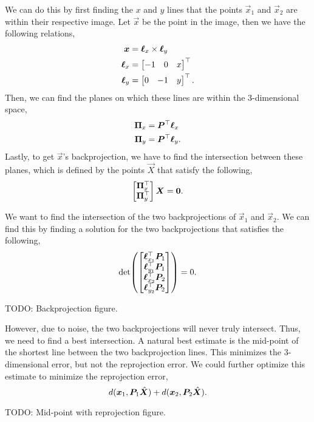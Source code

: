 We can do this by first finding the $x$ and $y$ lines that the points
$\vec{x}_1$ and $\vec{x}_2$ are within their respective image. Let $\vec{x}$ be
the point in the image, then we have the following relations,
\begin{align*}
  \bm{x} &= \bm{\ell}_x \times \bm{\ell}_y \\
  \bm{\ell}_x &= \begin{bmatrix} -1 & 0 & x \end{bmatrix}^\top \\
  \bm{\ell}_y &= \begin{bmatrix} 0 & -1 & y \end{bmatrix}^\top
.\end{align*}
Then, we can find the planes on which these lines are within the 3-dimensional
space,
\begin{align}
  \bm{\Pi}_x &= \bm{P}^\top \bm{\ell}_x \\
  \bm{\Pi}_y &= \bm{P}^\top \bm{\ell}_y
.\end{align}
Lastly, to get $\vec{x}$'s backprojection, we have to find the intersection
between these planes, which is defined by the points $\vec{X}$ that satisfy the
following, \[
  \begin{bmatrix} \bm{\Pi}_x^\top \\ \bm{\Pi}_y^\top \end{bmatrix} \bm{X} = \bm{0}
.\]

We want to find the intersection of the two backprojections of $\vec{x}_1$ and
$\vec{x}_2$. We can find this by finding a solution for the two
backprojections that satisfies the following, \[
  \det{\begin{bmatrix} \transpose{\vec{\ell}_{x_1}} \mat{P}_1 \\ \transpose{\vec{\ell}_{y_1}} \mat{P}_1 \\ \transpose{\vec{\ell}_{x_2}} \mat{P}_2 \\ \transpose{\vec{\ell}_{y_2}} \mat{P}_2 \end{bmatrix}} = 0
.\]

TODO: Backprojection figure.

However, due to noise, the two backprojections will never truly intersect.
Thus, we need to find a best intersection. A natural best estimate is the
mid-point of the shortest line between the two backprojection lines. This
minimizes the 3-dimensional error, but not the reprojection error. We could
further optimize this estimate to minimize the reprojection error, \[
  d(\bm{x}_1, \bm{P}_1 \hat{\bm{X}}) + d(\bm{x}_2, \bm{P}_2 \hat{\bm{X}})
.\]

TODO: Mid-point with reprojection figure.
